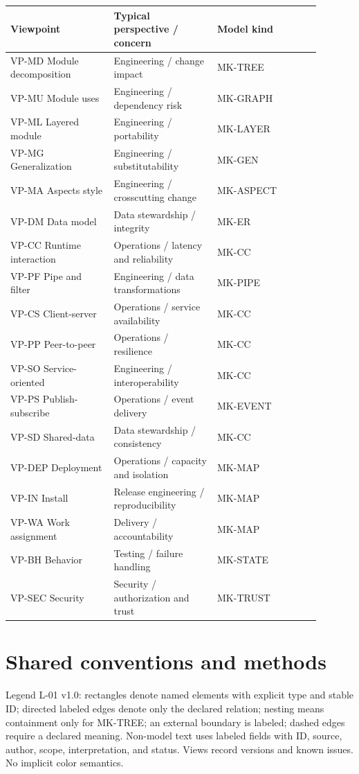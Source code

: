 \documentclass[11pt,letterpaper]{article}
\newcommand{\docsection}[1]{\Needspace{5\baselineskip}\section{#1}}
\begin{document}
\begin{longtable}{@{}>{\RaggedRight\arraybackslash}p{0.297\linewidth}>{\RaggedRight\arraybackslash}p{0.297\linewidth}>{\RaggedRight\arraybackslash}p{0.297\linewidth}@{}}
\toprule
\textbf{Viewpoint} & \textbf{Typical perspective / concern} & \textbf{Model kind}\\\midrule
\endhead
VP-MD Module decomposition & Engineering / change impact & MK-TREE\\
VP-MU Module uses & Engineering / dependency risk & MK-GRAPH\\
VP-ML Layered module & Engineering / portability & MK-LAYER\\
VP-MG Generalization & Engineering / substitutability & MK-GEN\\
VP-MA Aspects style & Engineering / crosscutting change & MK-ASPECT\\
VP-DM Data model & Data stewardship / integrity & MK-ER\\
VP-CC Runtime interaction & Operations / latency and reliability & MK-CC\\
VP-PF Pipe and filter & Engineering / data transformations & MK-PIPE\\
VP-CS Client-server & Operations / service availability & MK-CC\\
VP-PP Peer-to-peer & Operations / resilience & MK-CC\\
VP-SO Service-oriented & Engineering / interoperability & MK-CC\\
VP-PS Publish-subscribe & Operations / event delivery & MK-EVENT\\
VP-SD Shared-data & Data stewardship / consistency & MK-CC\\
VP-DEP Deployment & Operations / capacity and isolation & MK-MAP\\
VP-IN Install & Release engineering / reproducibility & MK-MAP\\
VP-WA Work assignment & Delivery / accountability & MK-MAP\\
VP-BH Behavior & Testing / failure handling & MK-STATE\\
VP-SEC Security & Security / authorization and trust & MK-TRUST\\
\bottomrule
\end{longtable}
\docsection{Shared conventions and methods}
Legend L-01 v1.0: rectangles denote named elements with explicit type and stable ID; directed labeled edges denote only the declared relation; nesting means containment only for MK-TREE; an external boundary is labeled; dashed edges require a declared meaning. Non-model text uses labeled fields with ID, source, author, scope, interpretation, and status. Views record versions and known issues. No implicit color semantics.
\end{document}
